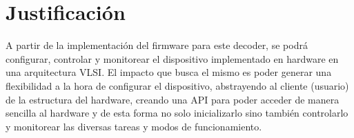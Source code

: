 
\section{Justificación}
\label{sec:justificacion}
A partir de la implementación del firmware para este decoder, se podrá configurar, controlar y monitorear el dispositivo implementado en hardware en una arquitectura VLSI. El impacto que busca el mismo es poder generar una flexibilidad a la hora de configurar el dispositivo, abstrayendo al cliente (usuario) de la estructura del hardware, creando una API para poder acceder de manera sencilla al hardware y de esta forma no solo inicializarlo sino también controlarlo y monitorear las diversas tareas y modos de funcionamiento.

